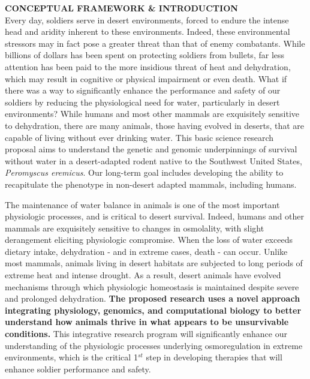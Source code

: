 \documentclass[12pt]{article}
\begin{document}

\setcounter{page}{1}

\noindent \textbf{CONCEPTUAL FRAMEWORK \& INTRODUCTION} \\


Every day, soldiers serve in desert environments, forced to endure the intense head and aridity inherent to these environments. Indeed, these environmental stressors may in fact pose a greater threat than that of enemy combatants. While billions of dollars has been spent on protecting soldiers from bullets, far less attention has been paid to the more insidious threat of heat and dehydration, which may result in cognitive or physical impairment or even death. What if there was a way to significantly enhance the performance and safety of our soldiers by reducing the physiological need for water, particularly in desert environments? While humans and most other mammals are exquisitely sensitive to dehydration, there are many animals, those having evolved in deserts, that are capable of living without ever drinking water. This basic science research proposal aims to understand the genetic and genomic underpinnings of survival without water in a desert-adapted rodent native to the Southwest United States, \textit{Peromyscus eremicus}. Our long-term goal includes developing the ability to recapitulate the phenotype in non-desert adapted mammals, including humans.

The maintenance of water balance in animals is one of the most important physiologic processes, and is critical to desert survival. Indeed, humans and other mammals are exquisitely sensitive to changes in osmolality, with slight derangement eliciting physiologic compromise.  When the loss of water exceeds dietary intake, dehydration - and in extreme cases, death - can occur.  Unlike most mammals, animals living in desert habitats are subjected to long periods of extreme heat and intense drought.  As a result, desert animals have evolved mechanisms through which physiologic homeostasis is maintained despite severe and prolonged dehydration. \textbf{The proposed research uses a novel approach integrating physiology, genomics, and computational biology to better understand how animals thrive in what appears to be unsurvivable conditions.} This integrative research program will significantly enhance our understanding of the physiologic processes underlying osmoregulation in extreme environments, which is the critical 1$^{st}$ step in developing therapies that will enhance soldier performance and safety.
\end{document}
